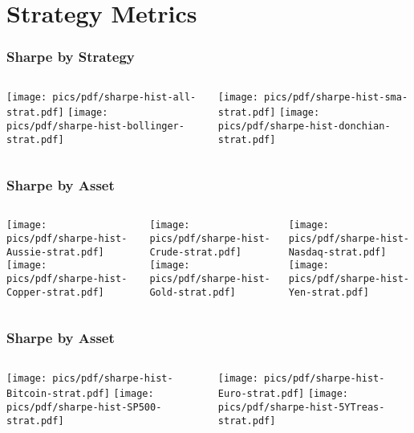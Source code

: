 \documentclass[9pt]{beamer}
\begin{document}
\section{Strategy Metrics} 
\begin{frame}
    \frametitle{Sharpe by Strategy}
    \begin{columns}
    \begin{column}{.5\textwidth}
    \texttt{[image: pics/pdf/sharpe-hist-all-strat.pdf]}
    \texttt{[image: pics/pdf/sharpe-hist-bollinger-strat.pdf]}
    \end{column}
    \begin{column}{.5\textwidth}
    \texttt{[image: pics/pdf/sharpe-hist-sma-strat.pdf]}
    \texttt{[image: pics/pdf/sharpe-hist-donchian-strat.pdf]}
    \end{column}
    \end{columns}
\end{frame}
\begin{frame}
    \frametitle{Sharpe by Asset}
    \begin{columns}
    \begin{column}{.3\textwidth}
    \texttt{[image: pics/pdf/sharpe-hist-Aussie-strat.pdf]}
    \texttt{[image: pics/pdf/sharpe-hist-Copper-strat.pdf]}
    \end{column}
    \begin{column}{.3\textwidth}
    \texttt{[image: pics/pdf/sharpe-hist-Crude-strat.pdf]}
    \texttt{[image: pics/pdf/sharpe-hist-Gold-strat.pdf]}
    \end{column}
    \begin{column}{.3\textwidth}
    \texttt{[image: pics/pdf/sharpe-hist-Nasdaq-strat.pdf]}
    \texttt{[image: pics/pdf/sharpe-hist-Yen-strat.pdf]}
    \end{column}
    \end{columns}
\end{frame}
\begin{frame}
    \frametitle{Sharpe by Asset}
    \begin{columns}
    \begin{column}{.3\textwidth}
    \texttt{[image: pics/pdf/sharpe-hist-Bitcoin-strat.pdf]}
    \texttt{[image: pics/pdf/sharpe-hist-SP500-strat.pdf]}
    \end{column}
    \begin{column}{.3\textwidth}
    \texttt{[image: pics/pdf/sharpe-hist-Euro-strat.pdf]}
    \texttt{[image: pics/pdf/sharpe-hist-5YTreas-strat.pdf]}
    \end{column}
    \end{columns}
\end{frame}
\end{document}
